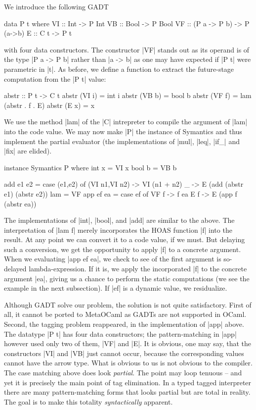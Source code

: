 \documentclass[preprint]{sigplanconf}
\begin{document}
We introduce the following GADT
\begin{code}
data P t where
    VI :: Int  -> P Int
    VB :: Bool -> P Bool
    VF :: (P a -> P b) -> P (a->b)
    E  :: C t -> P t
\end{code}
with four data constructors. The constructor |VF| stands out as its
operand is of the type |P a -> P b| rather than |a -> b| as one may
have expected if |P t| were parametric in |t|. As before, we define a
function to extract the future-stage computation from the |P t| value:
\begin{code}
abstr :: P t -> C t
abstr (VI i) = int i
abstr (VB b) = bool b
abstr (VF f) = lam (abstr . f . E)
abstr (E x)  = x
\end{code}

We use the method |lam| of the |C| intrepreter to compile the argument
of |lam| into the code value. We may now make |P| the instance of
Symantics and thus implement the partial evaluator (the
implementations of |mul|, |leq|, |if_| and |fix| are elided).
\begin{code}
instance Symantics P where
    int x  = VI x
    bool b = VB b

    add e1 e2 = case (e1,e2) of
                 (VI n1,VI n2) -> VI (n1 + n2)
                 _ -> E (add (abstr e1) (abstr e2))
    lam = VF
    app ef ea = case ef of
                        VF f -> f ea
                        E  f -> E (app f (abstr ea))
\end{code}

The implementations of |int|, |bool|, and |add| are similar to the
above. The interpretation of |lam f| merely incorporates the
HOAS function |f| into the result. At any point we can convert it to a
code value, if we must. But delaying such a conversion, we get the
opportunity to apply |f| to a concrete argument. When we evaluating
|app ef ea|, we check to see of the first argument is so-delayed
lambda-expression. If it is, we apply the incorporated |f| to the
concrete argument |ea|, giving us a chance to perform the static
computations (we see the example in the next subsection). If |ef| is a
dynamic value, we residualize.


Although GADT solve our problem, the solution is not quite
satisfactory. First of all, it cannot be ported to MetaOCaml as GADTs
are not supported in OCaml. Second, the tagging problem reappeared, in
the implementation of |app| above. The datatype |P t| has four data
constructors; the pattern-matching in |app| however used only two of
them, |VF| and |E|. It is obvious, one may say, that the constructors
|VI| and |VB| just cannot occur, because the corresponding values
cannot have the arrow type. What is obvious to us is not obvious to
the compiler. The case matching above does look \emph{partial}. The
point may loop tenuous -- and yet it is precisely the main point of
tag elimination. In a typed tagged interpreter there are many
pattern-matching forms that looks partial but are total in
reality. The goal is to make this totality \emph{syntactically}
apparent.
\end{document}
